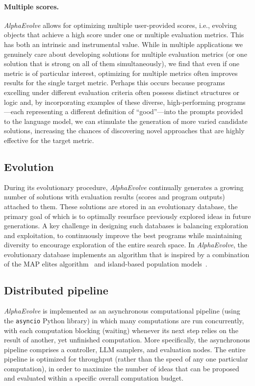 \documentclass[logo,copyright,12pt]{googledeepmind}
\theoremstyle{definition}
\theoremstyle{remark}
\theoremstyle{plain}
\newcommand{\method}{\emph{AlphaEvolve}\xspace}
\begin{document}
\paragraph{Multiple scores.}
\method allows for optimizing multiple user-provided scores, i.e., evolving objects that achieve a high score under one or multiple evaluation metrics.
This has both an intrinsic and instrumental value. While in multiple applications we genuinely care about developing solutions for multiple evaluation metrics (or one solution that is strong on all of them simultaneously), we find that even if one metric is of particular interest, optimizing for multiple metrics often improves results for the single target metric.
Perhaps this occurs because programs excelling under different evaluation criteria often possess distinct structures or logic and, by incorporating examples of these diverse, high-performing programs---each representing a different definition of ``good''---into the prompts provided to the language model, we can stimulate the generation of more varied candidate solutions, increasing the chances of discovering novel approaches that are highly effective for the target metric.


\subsection{Evolution}
\label{subsec:evolution}

During its evolutionary procedure, \method continually generates a growing number of solutions with evaluation results (scores and program outputs) attached to them.
These solutions are stored in an evolutionary database, the primary goal of which is to optimally resurface previously explored ideas in future generations.
A key challenge in designing such databases is balancing exploration and exploitation, to continuously improve the best programs while maintaining diversity to encourage exploration of the entire search space.
In \method, the evolutionary database implements an algorithm that is inspired by a combination of the MAP elites algorithm~\cite{mouret2015illuminating} and island-based population models~\cite{tanese1989distributed, paredes2023mathematical}.


\subsection{Distributed pipeline}
\label{subsec:pipeline}

\method is implemented as an asynchronous computational pipeline (using the \texttt{asyncio} Python library) in which many computations are run concurrently, with each computation blocking (waiting) whenever its next step relies on the result of another, yet unfinished computation.
More specifically, the asynchronous pipeline comprises a controller, LLM samplers, and evaluation nodes.
The entire pipeline is optimized for throughput (rather than the speed of any one particular computation), in order to maximize the number of ideas that can be proposed and evaluated within a specific overall computation budget.
\end{document}
